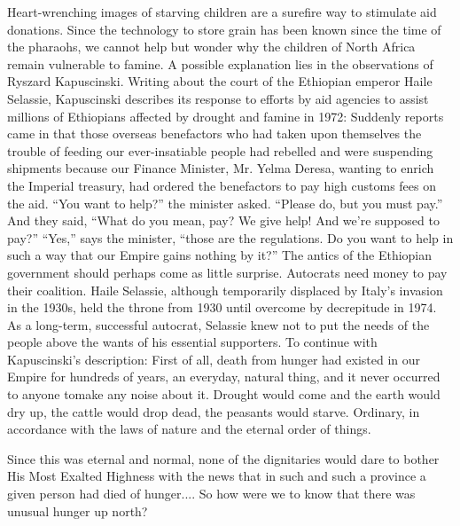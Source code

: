 \documentclass[10pt]{article}
\begin{document}
{\large Heart-wrenching images of starving children are a surefire way to
stimulate aid donations. Since the technology to store grain has been known since
the time of the pharaohs, we cannot help but wonder why the children of North
Africa remain vulnerable to famine. A possible explanation lies in the
observations of Ryszard Kapuscinski. Writing about the court of the Ethiopian
emperor Haile Selassie, Kapuscinski describes its response to efforts by aid
agencies to assist millions of Ethiopians affected by drought and famine in 1972:
Suddenly reports came in that those overseas benefactors who had taken upon
themselves the trouble of feeding our ever-insatiable people had rebelled and
were suspending shipments because our Finance Minister, Mr. Yelma Deresa, wanting
to enrich the Imperial treasury, had ordered the benefactors to pay high customs
fees on the aid. ``You want to help?'' the minister asked. ``Please do, but you
must pay.'' And they said, ``What do you mean, pay? We give help! And we're
supposed to pay?'' ``Yes,'' says the minister, ``those are the regulations. Do
you want to help in such a way that our Empire gains nothing by it?'' The antics
of the Ethiopian government should perhaps come as little surprise. Autocrats
need money to pay their coalition. Haile Selassie, although temporarily displaced
by Italy's invasion in the 1930s, held the throne from 1930 until overcome by
decrepitude in 1974. As a long-term, successful autocrat, Selassie knew not to
put the needs of the people above the wants of his essential supporters. To
continue with Kapuscinski's description: First of all, death from hunger had
existed in our Empire for hundreds of years, an everyday, natural thing, and it
never occurred to anyone tomake any noise about it. Drought would come and the
earth would dry up, the cattle would drop dead, the peasants would starve.
Ordinary, in accordance with the laws of nature and the eternal order of things.}

{\large Since this was eternal and normal, none of the dignitaries would dare to
bother His Most Exalted Highness with the news that in such and such a province a
given person had died of hunger.... So how were we to know that there was unusual
hunger up north?}
\end{document}
